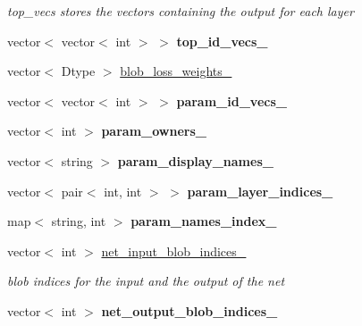 \begin{DoxyCompactItemize}
\begin{DoxyCompactList}\small\item\em top\+\_\+vecs stores the vectors containing the output for each layer \end{DoxyCompactList}\item 
vector$<$ vector$<$ int $>$ $>$ {\bfseries top\+\_\+id\+\_\+vecs\+\_\+}\hypertarget{classcaffe_1_1Net_aacacd1d6a07c61694433d4ce5ca8b0be}{}\label{classcaffe_1_1Net_aacacd1d6a07c61694433d4ce5ca8b0be}

\item 
vector$<$ Dtype $>$ \hyperlink{classcaffe_1_1Net_a3eef6ff47640210c6d8d6affb1fd86f8}{blob\+\_\+loss\+\_\+weights\+\_\+}
\item 
vector$<$ vector$<$ int $>$ $>$ {\bfseries param\+\_\+id\+\_\+vecs\+\_\+}\hypertarget{classcaffe_1_1Net_a6cbf183267aaf3376791cae1f87e453b}{}\label{classcaffe_1_1Net_a6cbf183267aaf3376791cae1f87e453b}

\item 
vector$<$ int $>$ {\bfseries param\+\_\+owners\+\_\+}\hypertarget{classcaffe_1_1Net_a91c4180a2d5d02e4611aa0115d819b66}{}\label{classcaffe_1_1Net_a91c4180a2d5d02e4611aa0115d819b66}

\item 
vector$<$ string $>$ {\bfseries param\+\_\+display\+\_\+names\+\_\+}\hypertarget{classcaffe_1_1Net_a3a3106ac0e80ac35fa86bb1fa1389d57}{}\label{classcaffe_1_1Net_a3a3106ac0e80ac35fa86bb1fa1389d57}

\item 
vector$<$ pair$<$ int, int $>$ $>$ {\bfseries param\+\_\+layer\+\_\+indices\+\_\+}\hypertarget{classcaffe_1_1Net_a311bb80fcaae27f867917392061ad327}{}\label{classcaffe_1_1Net_a311bb80fcaae27f867917392061ad327}

\item 
map$<$ string, int $>$ {\bfseries param\+\_\+names\+\_\+index\+\_\+}\hypertarget{classcaffe_1_1Net_a341f8e5deb13d6851537e72155a38576}{}\label{classcaffe_1_1Net_a341f8e5deb13d6851537e72155a38576}

\item 
vector$<$ int $>$ \hyperlink{classcaffe_1_1Net_a083a9a4c3919721c833b53d5571a7400}{net\+\_\+input\+\_\+blob\+\_\+indices\+\_\+}\hypertarget{classcaffe_1_1Net_a083a9a4c3919721c833b53d5571a7400}{}\label{classcaffe_1_1Net_a083a9a4c3919721c833b53d5571a7400}

\begin{DoxyCompactList}\small\item\em blob indices for the input and the output of the net \end{DoxyCompactList}\item 
vector$<$ int $>$ {\bfseries net\+\_\+output\+\_\+blob\+\_\+indices\+\_\+}\hypertarget{classcaffe_1_1Net_ad040ba707c05ef2a4ac86009cbd4a0ba}{}\label{classcaffe_1_1Net_ad040ba707c05ef2a4ac86009cbd4a0ba}


\end{DoxyCompactItemize}
